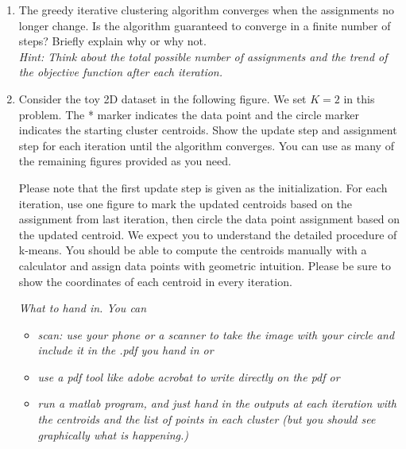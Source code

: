   \begin{enumerate}
\item {} The greedy iterative clustering algorithm converges when the assignments no longer change. Is the algorithm guaranteed to converge in a finite number of steps? Briefly explain why or why not.\\
{\em Hint: Think about the total possible number of assignments and the trend of the objective function after each iteration.}

\item {} Consider the toy 2D dataset in the following
  figure. We set $K = 2$ in this problem. The * marker indicates the
  data point and the circle marker indicates the starting cluster
  centroids. Show the update step and assignment step for each
  iteration until the algorithm converges. You can use as many of the 
  remaining figures provided as you need.

Please note that the first update step is given as the
initialization. For each iteration, use one figure to mark the updated
centroids based on the assignment from last iteration, then circle the
data point assignment based on the updated centroid. We expect you to
understand the detailed procedure of k-means. You should be able to
compute the centroids manually with a calculator and assign data
points with geometric intuition. Please be sure to show the
coordinates of each centroid in every iteration.

{\em What to hand in.  You can }
\begin{itemize}
\item {\em scan: use your phone or a scanner to take the image with your circle
and include it in the .pdf you hand in or}
\item {\em use a pdf tool like adobe acrobat to write directly on the pdf or }
\item {\em run a matlab program, and just hand in the outputs at each iteration with the centroids and the list of
    points in each cluster (but you should see graphically what is happening.)}
\end{itemize}


\end{enumerate}
